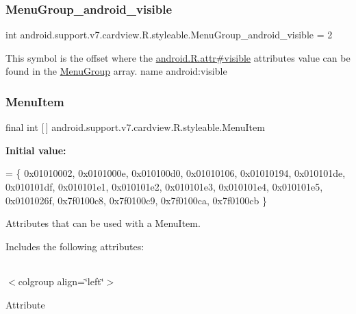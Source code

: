 \subsubsection{\texorpdfstring{Menu\+Group\+\_\+android\+\_\+visible}{MenuGroup\_android\_visible}}
{\footnotesize\ttfamily int android.\+support.\+v7.\+cardview.\+R.\+styleable.\+Menu\+Group\+\_\+android\+\_\+visible = 2\hspace{0.3cm}{\ttfamily [static]}}

This symbol is the offset where the \hyperlink{}{android.\+R.\+attr\#visible} attribute\textquotesingle{}s value can be found in the \hyperlink{classandroid_1_1support_1_1v7_1_1cardview_1_1R_1_1styleable_aec12064c9ec8c2dea3c20674737c17ed}{Menu\+Group} array.  name android\+:visible \mbox{\label{classandroid_1_1support_1_1v7_1_1cardview_1_1R_1_1styleable_a0a483b830af809d94b22d4901e758447}} 
\subsubsection{\texorpdfstring{Menu\+Item}{MenuItem}}
{\footnotesize\ttfamily final int \mbox{[}$\,$\mbox{]} android.\+support.\+v7.\+cardview.\+R.\+styleable.\+Menu\+Item\hspace{0.3cm}{\ttfamily [static]}}

{\bfseries Initial value\+:}
\begin{DoxyCode}
= \{
            0x01010002, 0x0101000e, 0x010100d0, 0x01010106,
            0x01010194, 0x010101de, 0x010101df, 0x010101e1,
            0x010101e2, 0x010101e3, 0x010101e4, 0x010101e5,
            0x0101026f, 0x7f0100c8, 0x7f0100c9, 0x7f0100ca,
            0x7f0100cb
        \}
\end{DoxyCode}
Attributes that can be used with a Menu\+Item. 

Includes the following attributes\+:

\tabulinesep=1mm
\begin{longtabu} spread 0pt [c]{*{0}{|X[-1]}|}
\hline
\end{longtabu}
$<$colgroup align=\char`\"{}left\char`\"{}$>$ 

Attribute

